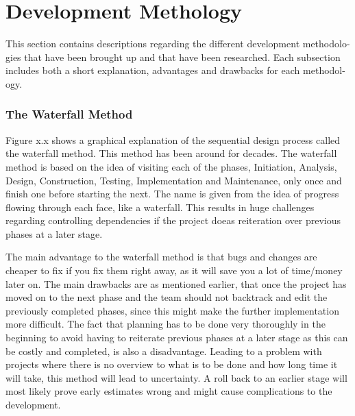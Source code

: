 \chapter{Development Methology}
This section contains descriptions regarding the different development
methodolo- gies that have been brought up and that have been researched. Each subsection
includes both a short explanation, advantages and drawbacks for each methodol-
ogy.

\subsection{The Waterfall Method}
Figure x.x shows a graphical explanation of the sequential design process called the waterfall method. This method has been around for decades. The waterfall method is based on the idea of visiting each of the phases, Initiation, Analysis, Design, Construction, Testing, Implementation and Maintenance, only once and finish one before starting the next. The name is given from the idea of progress flowing through each face, like a waterfall. This results in huge challenges regarding controlling dependencies if the project doeas reiteration over previous phases at a later stage.

The main advantage to the waterfall method is that bugs and changes are cheaper to fix if you fix them right away, as it will save you a lot of time/money later on.
The main drawbacks are as mentioned earlier, that once the project has moved on to the next phase and the team should not backtrack and edit the previously completed phases, since this might make the further implementation more difficult. The fact that planning has to be done very thoroughly in the beginning to avoid having to reiterate previous phases at a later stage as this can be costly and completed, is also a disadvantage. Leading to a problem with projects where there is no overview to what is to be done and how long time it will take, this method will lead to uncertainty. A roll back to an earlier stage will most likely prove early estimates wrong and might cause complications to the development.

